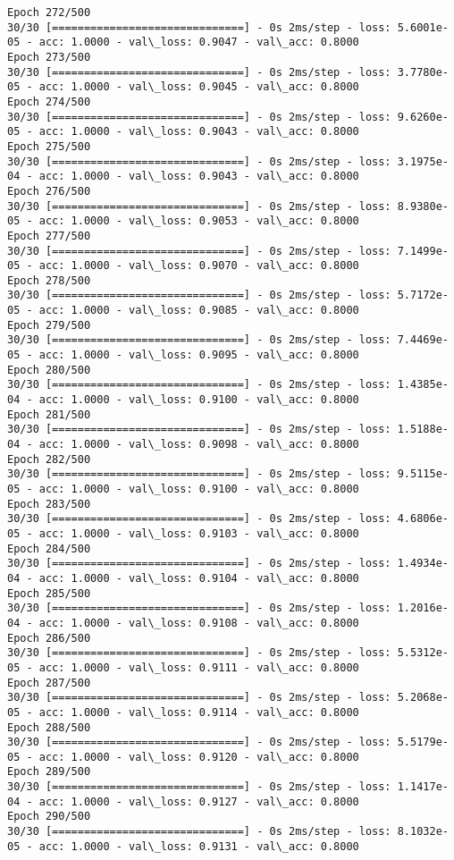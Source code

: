 \documentclass[11pt]{article}
\begin{document}
\begin{Verbatim}[commandchars=\\\{\}]
Epoch 272/500
30/30 [==============================] - 0s 2ms/step - loss: 5.6001e-05 - acc: 1.0000 - val\_loss: 0.9047 - val\_acc: 0.8000
Epoch 273/500
30/30 [==============================] - 0s 2ms/step - loss: 3.7780e-05 - acc: 1.0000 - val\_loss: 0.9045 - val\_acc: 0.8000
Epoch 274/500
30/30 [==============================] - 0s 2ms/step - loss: 9.6260e-05 - acc: 1.0000 - val\_loss: 0.9043 - val\_acc: 0.8000
Epoch 275/500
30/30 [==============================] - 0s 2ms/step - loss: 3.1975e-04 - acc: 1.0000 - val\_loss: 0.9043 - val\_acc: 0.8000
Epoch 276/500
30/30 [==============================] - 0s 2ms/step - loss: 8.9380e-05 - acc: 1.0000 - val\_loss: 0.9053 - val\_acc: 0.8000
Epoch 277/500
30/30 [==============================] - 0s 2ms/step - loss: 7.1499e-05 - acc: 1.0000 - val\_loss: 0.9070 - val\_acc: 0.8000
Epoch 278/500
30/30 [==============================] - 0s 2ms/step - loss: 5.7172e-05 - acc: 1.0000 - val\_loss: 0.9085 - val\_acc: 0.8000
Epoch 279/500
30/30 [==============================] - 0s 2ms/step - loss: 7.4469e-05 - acc: 1.0000 - val\_loss: 0.9095 - val\_acc: 0.8000
Epoch 280/500
30/30 [==============================] - 0s 2ms/step - loss: 1.4385e-04 - acc: 1.0000 - val\_loss: 0.9100 - val\_acc: 0.8000
Epoch 281/500
30/30 [==============================] - 0s 2ms/step - loss: 1.5188e-04 - acc: 1.0000 - val\_loss: 0.9098 - val\_acc: 0.8000
Epoch 282/500
30/30 [==============================] - 0s 2ms/step - loss: 9.5115e-05 - acc: 1.0000 - val\_loss: 0.9100 - val\_acc: 0.8000
Epoch 283/500
30/30 [==============================] - 0s 2ms/step - loss: 4.6806e-05 - acc: 1.0000 - val\_loss: 0.9103 - val\_acc: 0.8000
Epoch 284/500
30/30 [==============================] - 0s 2ms/step - loss: 1.4934e-04 - acc: 1.0000 - val\_loss: 0.9104 - val\_acc: 0.8000
Epoch 285/500
30/30 [==============================] - 0s 2ms/step - loss: 1.2016e-04 - acc: 1.0000 - val\_loss: 0.9108 - val\_acc: 0.8000
Epoch 286/500
30/30 [==============================] - 0s 2ms/step - loss: 5.5312e-05 - acc: 1.0000 - val\_loss: 0.9111 - val\_acc: 0.8000
Epoch 287/500
30/30 [==============================] - 0s 2ms/step - loss: 5.2068e-05 - acc: 1.0000 - val\_loss: 0.9114 - val\_acc: 0.8000
Epoch 288/500
30/30 [==============================] - 0s 2ms/step - loss: 5.5179e-05 - acc: 1.0000 - val\_loss: 0.9120 - val\_acc: 0.8000
Epoch 289/500
30/30 [==============================] - 0s 2ms/step - loss: 1.1417e-04 - acc: 1.0000 - val\_loss: 0.9127 - val\_acc: 0.8000
Epoch 290/500
30/30 [==============================] - 0s 2ms/step - loss: 8.1032e-05 - acc: 1.0000 - val\_loss: 0.9131 - val\_acc: 0.8000

\end{Verbatim}
\end{document}
